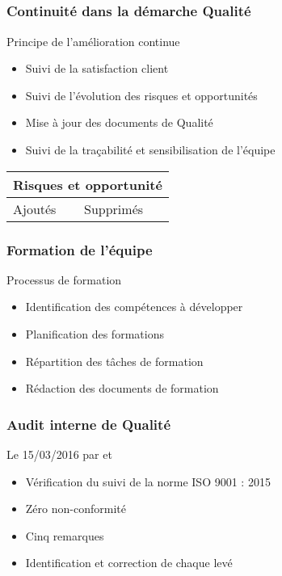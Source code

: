 
\speaker{\Pierre}

\subsection{} %


\begin{frame}
\frametitle{Continuité dans la démarche Qualité}
\begin{block}{Principe de l'amélioration continue}
\begin{itemize}
\item Suivi de la satisfaction client
\item Suivi de l'évolution des risques et opportunités
\item Mise à jour des documents de Qualité
\item Suivi de la traçabilité et sensibilisation de l'équipe
\end{itemize}
\end{block}
\begin{longtable}{|p{3cm}|p{3cm}|}
\hline
\multicolumn{2}{|c|}{Risques et opportunité} \\\hline
Ajoutés & Supprimés \\\hline

\end{longtable}
\end{frame}



\begin{frame}
\frametitle{Formation de l'équipe}
\begin{block}{Processus de formation}
\begin{itemize}
\item Identification des compétences à développer
\item Planification des formations
\item Répartition des tâches de formation
\item Rédaction des documents de formation
\end{itemize}
\end{block}
\end{frame}



\begin{frame}
\frametitle{Audit interne de Qualité}
\begin{block}{Le 15/03/2016 par \nomApprobateur{} et \nomTuteurQualite{}}
\begin{itemize}
\item Vérification du suivi de la norme ISO 9001 : 2015
\item Zéro non-conformité
\item Cinq remarques
\item Identification et correction de chaque \FT{} levé
\end{itemize}
\end{block}
\end{frame}





